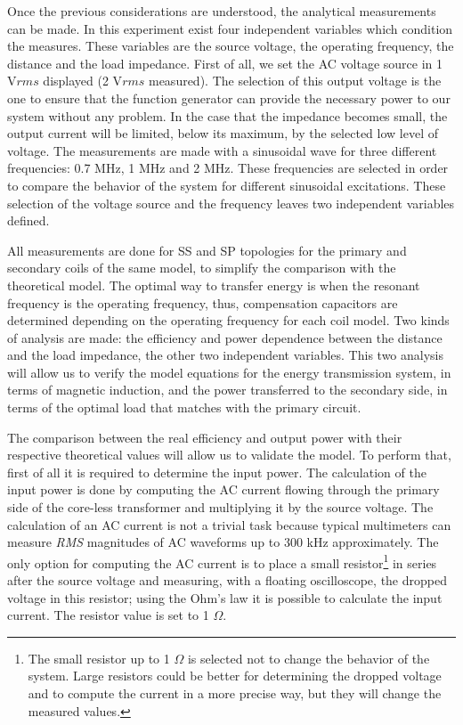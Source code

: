 Once the previous considerations are understood, the analytical measurements can be made. In this experiment exist four independent variables which condition the measures. These variables are the source voltage, the operating frequency, the distance and the load impedance. First of all, we set the AC voltage source in 1 V$rms$ displayed (2 V$rms$ measured). The selection of this output voltage is the one to ensure that the function generator can provide the necessary power to our system without any problem. In the case that the impedance becomes small, the output current will be limited, below its maximum, by the selected low level of voltage. The measurements are made with a sinusoidal wave for three different frequencies: 0.7 MHz, 1 MHz and 2 MHz. These frequencies are selected in order to compare the behavior of the system for different sinusoidal excitations. These selection of the voltage source and the frequency leaves two independent variables defined. 

All measurements are done for SS and SP topologies for the primary and secondary coils of the same model, to simplify the comparison with the theoretical model. The optimal way to transfer energy is when the resonant frequency is the operating frequency, thus, compensation capacitors are determined depending on the operating frequency for each coil model. Two kinds of analysis are made: the efficiency and power dependence between the distance and the load impedance, the other two independent variables. This two analysis will allow us to verify the model equations for the energy transmission system, in terms of magnetic induction, and the power transferred to the secondary side, in terms of the optimal load that matches with the primary circuit.

The comparison between the real efficiency and output power with their respective theoretical values will allow us to validate the model. To perform that, first of all it is required to determine the input power. The calculation of the input power is done by computing the AC current flowing through the primary side of the core-less transformer and multiplying it by the source voltage. The calculation of an AC current is not a trivial task because typical multimeters can measure \textit{RMS} magnitudes of AC waveforms up to 300 kHz approximately. The only option for computing the AC current is to place a small resistor\footnote{The small resistor up to 1 $\Omega$ is selected not to change the behavior of the system. Large resistors could be better for determining the dropped voltage and to compute the current in a more precise way, but they will change the measured values.} in series after the source voltage and measuring, with a floating oscilloscope, the dropped voltage in this resistor; using the Ohm's law it is possible to calculate the input current. The resistor value is set to 1 $\Omega$. 

